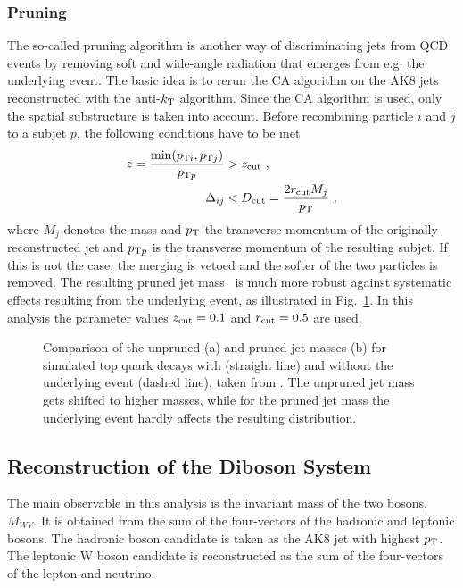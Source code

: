 \subsubsection*{Pruning}
The so-called pruning algorithm \cite{pruning} is another way of discriminating jets from QCD events by removing soft and wide-angle radiation that emerges from e.g. the underlying event. The basic idea is to rerun the CA algorithm on the AK8 jets reconstructed with the anti-$k_{\rm T}$ algorithm. Since the CA algorithm is used, only the spatial substructure is taken into account.  Before recombining particle $i$ and $j$ to a subjet $p$, the following conditions have to be met
\begin{align}
z = \frac{\min (p_{{\rm T}i},p_{{\rm T}j})}{p_{{\rm T}p}} &> z_{\rm cut} ~, \\
\Delta_{ij} &< D_{\rm cut} = \frac{2r_{\rm cut}M_j}{p_{\rm T}} ~,
\end{align}
where $M_j$ denotes the mass and $p_{\rm T}$ the transverse momentum of the originally reconstructed jet and $p_{{\rm T}p}$ is the transverse momentum of the resulting subjet. If this is not the case, the merging is vetoed and the softer of the two particles is removed. The resulting pruned jet mass \Mpr \ is much more robust against systematic effects resulting from the underlying event, as illustrated in Fig.~\ref{fig:reco:pruning}. In this analysis the parameter values $z_{\rm cut}=0.1$ and $r_{\rm cut}=0.5$ are used.
\begin{figure}
	\centering
	\caption[Comparison of the pruned and unpruned jet masses for simulated top quark decays with and without the underlying event]{Comparison of the unpruned (a) and pruned jet masses (b) for simulated top quark decays with (straight line) and without the underlying event (dashed line), taken from \cite{pruning}. The unpruned jet mass gets shifted to higher masses, while for the pruned jet mass the underlying event hardly affects the resulting distribution.}
	\label{fig:reco:pruning}
\end{figure}
\subsection{Reconstruction of the Diboson System}
The main observable in this analysis is the invariant mass of the two bosons, $M_{WV}$. It is obtained from the sum of the four-vectors of the hadronic and leptonic bosons. The hadronic boson candidate is taken as the AK8 jet with highest $p_{\rm T}$. The leptonic W boson candidate is reconstructed as the sum of the four-vectors of the lepton and neutrino. 

